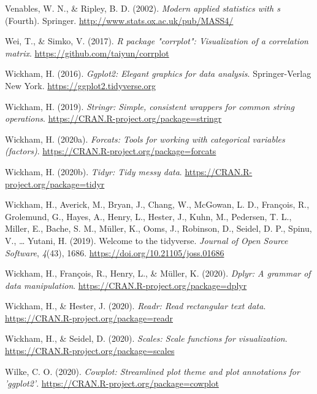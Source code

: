 \documentclass[
  english,
  man, noextraspace]{apa7}
\begin{document}
\begin{appendix}
\leavevmode\hypertarget{ref-R-MASS}{}%
Venables, W. N., \& Ripley, B. D. (2002). \emph{Modern applied
statistics with s} (Fourth). Springer.
\url{http://www.stats.ox.ac.uk/pub/MASS4/}

\leavevmode\hypertarget{ref-R-corrplot2017}{}%
Wei, T., \& Simko, V. (2017). \emph{R package "corrplot": Visualization
of a correlation matrix}. \url{https://github.com/taiyun/corrplot}

\leavevmode\hypertarget{ref-R-ggplot2}{}%
Wickham, H. (2016). \emph{Ggplot2: Elegant graphics for data analysis}.
Springer-Verlag New York. \url{https://ggplot2.tidyverse.org}

\leavevmode\hypertarget{ref-R-stringr}{}%
Wickham, H. (2019). \emph{Stringr: Simple, consistent wrappers for
common string operations}.
\url{https://CRAN.R-project.org/package=stringr}

\leavevmode\hypertarget{ref-R-forcats}{}%
Wickham, H. (2020a). \emph{Forcats: Tools for working with categorical
variables (factors)}. \url{https://CRAN.R-project.org/package=forcats}

\leavevmode\hypertarget{ref-R-tidyr}{}%
Wickham, H. (2020b). \emph{Tidyr: Tidy messy data}.
\url{https://CRAN.R-project.org/package=tidyr}

\leavevmode\hypertarget{ref-R-tidyverse}{}%
Wickham, H., Averick, M., Bryan, J., Chang, W., McGowan, L. D.,
François, R., Grolemund, G., Hayes, A., Henry, L., Hester, J., Kuhn, M.,
Pedersen, T. L., Miller, E., Bache, S. M., Müller, K., Ooms, J.,
Robinson, D., Seidel, D. P., Spinu, V., \ldots{} Yutani, H. (2019).
Welcome to the tidyverse. \emph{Journal of Open Source Software},
\emph{4}(43), 1686. \url{https://doi.org/10.21105/joss.01686}

\leavevmode\hypertarget{ref-R-dplyr}{}%
Wickham, H., François, R., Henry, L., \& Müller, K. (2020). \emph{Dplyr:
A grammar of data manipulation}.
\url{https://CRAN.R-project.org/package=dplyr}

\leavevmode\hypertarget{ref-R-readr}{}%
Wickham, H., \& Hester, J. (2020). \emph{Readr: Read rectangular text
data}. \url{https://CRAN.R-project.org/package=readr}

\leavevmode\hypertarget{ref-R-scales}{}%
Wickham, H., \& Seidel, D. (2020). \emph{Scales: Scale functions for
visualization}. \url{https://CRAN.R-project.org/package=scales}

\leavevmode\hypertarget{ref-R-cowplot}{}%
Wilke, C. O. (2020). \emph{Cowplot: Streamlined plot theme and plot
annotations for 'ggplot2'}.
\url{https://CRAN.R-project.org/package=cowplot}


\end{appendix}
\end{document}
